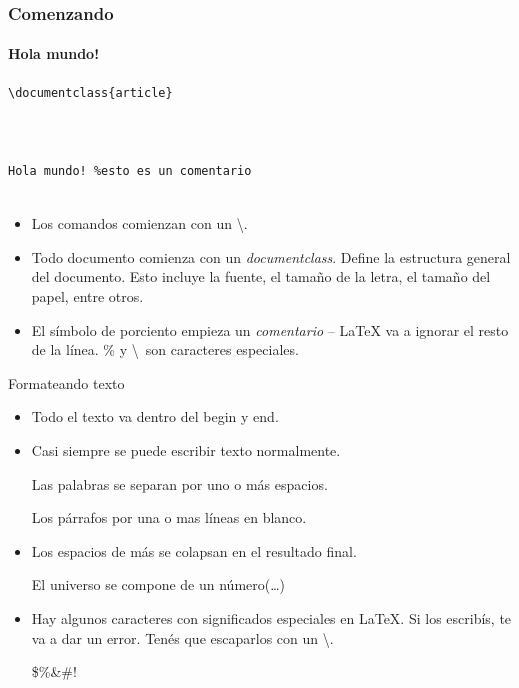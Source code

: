 \begin{frame}[fragile]
\frametitle{Comenzando}
\framesubtitle{Hola mundo!}

\begin{multicols}{2}
\begin{lstlisting}[title={hola\_mundo.tex}]
\documentclass{article}



Hola mundo! %esto es un comentario


\end{lstlisting}
\vspace*{\fill}
\columnbreak

\begin{itemize}
    \item Los comandos comienzan con un \textbackslash.
    \item Todo documento comienza con un \textit{documentclass}. Define la estructura general del documento. Esto incluye la fuente, el tamaño de la letra, el tamaño del papel, entre otros.    
    \item El símbolo de porciento empieza un \emph{comentario} -- \LaTeX{} va a ignorar el resto de la línea. \% y \textbackslash\ son caracteres especiales.
\end{itemize}

\end{multicols}
\end{frame}

\begin{frame}[fragile]{Formateando texto}
    \small
    \begin{itemize}
    \item Todo el texto va dentro del begin y end.
    \item Casi siempre se puede escribir texto normalmente.
    \begin{exampletwouptiny}
    Las palabras se separan 
    por uno o más espacios.

    Los párrafos por una o 
    mas líneas en blanco.
    \end{exampletwouptiny}
    \item Los espacios de más se colapsan en el resultado final.
    \begin{exampletwouptiny}

    El     universo    se compone 
    de un           número(\dots)
        
    \end{exampletwouptiny}
    \item Hay algunos caracteres con significados especiales en \LaTeX{}. Si los escribís, te va a dar un error. Tenés que escaparlos con un \textbackslash.
    \begin{exampletwoup}
        \$\%\&\#!
        \end{exampletwoup}
    \end{itemize}
\end{frame}


